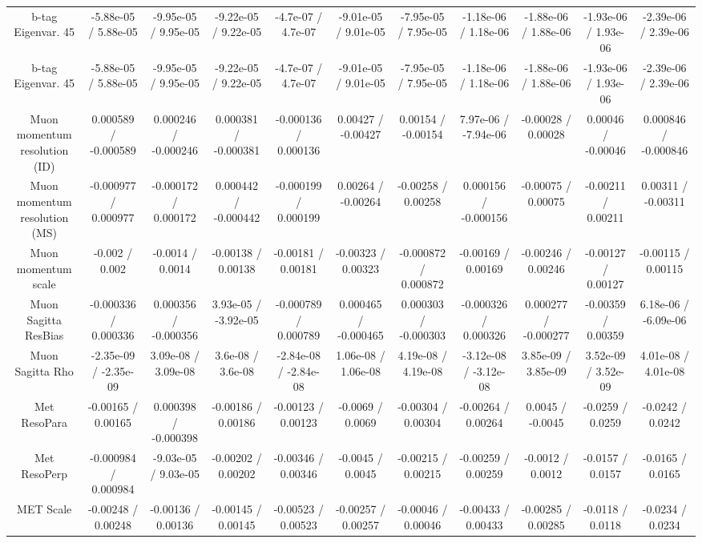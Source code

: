 \begin{table}[htbp]
\begin{center}
\begin{tabular}{|c|c|c|c|c|c|c|c|c|c|c|}
  b-tag Eigenvar. 45 & -5.88e-05 / 5.88e-05 & -9.95e-05 / 9.95e-05 & -9.22e-05 / 9.22e-05 & -4.7e-07 / 4.7e-07 & -9.01e-05 / 9.01e-05 & -7.95e-05 / 7.95e-05 & -1.18e-06 / 1.18e-06 & -1.88e-06 / 1.88e-06 & -1.93e-06 / 1.93e-06 & -2.39e-06 / 2.39e-06 \\ 
  b-tag Eigenvar. 45 & -5.88e-05 / 5.88e-05 & -9.95e-05 / 9.95e-05 & -9.22e-05 / 9.22e-05 & -4.7e-07 / 4.7e-07 & -9.01e-05 / 9.01e-05 & -7.95e-05 / 7.95e-05 & -1.18e-06 / 1.18e-06 & -1.88e-06 / 1.88e-06 & -1.93e-06 / 1.93e-06 & -2.39e-06 / 2.39e-06 \\ 
  Muon momentum resolution (ID) & 0.000589 / -0.000589 & 0.000246 / -0.000246 & 0.000381 / -0.000381 & -0.000136 / 0.000136 & 0.00427 / -0.00427 & 0.00154 / -0.00154 & 7.97e-06 / -7.94e-06 & -0.00028 / 0.00028 & 0.00046 / -0.00046 & 0.000846 / -0.000846 \\ 
  Muon momentum resolution (MS) & -0.000977 / 0.000977 & -0.000172 / 0.000172 & 0.000442 / -0.000442 & -0.000199 / 0.000199 & 0.00264 / -0.00264 & -0.00258 / 0.00258 & 0.000156 / -0.000156 & -0.00075 / 0.00075 & -0.00211 / 0.00211 & 0.00311 / -0.00311 \\ 
  Muon momentum scale & -0.002 / 0.002 & -0.0014 / 0.0014 & -0.00138 / 0.00138 & -0.00181 / 0.00181 & -0.00323 / 0.00323 & -0.000872 / 0.000872 & -0.00169 / 0.00169 & -0.00246 / 0.00246 & -0.00127 / 0.00127 & -0.00115 / 0.00115 \\ 
  Muon Sagitta ResBias & -0.000336 / 0.000336 & 0.000356 / -0.000356 & 3.93e-05 / -3.92e-05 & -0.000789 / 0.000789 & 0.000465 / -0.000465 & 0.000303 / -0.000303 & -0.000326 / 0.000326 & 0.000277 / -0.000277 & -0.00359 / 0.00359 & 6.18e-06 / -6.09e-06 \\ 
  Muon Sagitta Rho & -2.35e-09 / -2.35e-09 & 3.09e-08 / 3.09e-08 & 3.6e-08 / 3.6e-08 & -2.84e-08 / -2.84e-08 & 1.06e-08 / 1.06e-08 & 4.19e-08 / 4.19e-08 & -3.12e-08 / -3.12e-08 & 3.85e-09 / 3.85e-09 & 3.52e-09 / 3.52e-09 & 4.01e-08 / 4.01e-08 \\ 
  Met ResoPara & -0.00165 / 0.00165 & 0.000398 / -0.000398 & -0.00186 / 0.00186 & -0.00123 / 0.00123 & -0.0069 / 0.0069 & -0.00304 / 0.00304 & -0.00264 / 0.00264 & 0.0045 / -0.0045 & -0.0259 / 0.0259 & -0.0242 / 0.0242 \\ 
  Met ResoPerp & -0.000984 / 0.000984 & -9.03e-05 / 9.03e-05 & -0.00202 / 0.00202 & -0.00346 / 0.00346 & -0.0045 / 0.0045 & -0.00215 / 0.00215 & -0.00259 / 0.00259 & -0.0012 / 0.0012 & -0.0157 / 0.0157 & -0.0165 / 0.0165 \\ 
  MET Scale & -0.00248 / 0.00248 & -0.00136 / 0.00136 & -0.00145 / 0.00145 & -0.00523 / 0.00523 & -0.00257 / 0.00257 & -0.00046 / 0.00046 & -0.00433 / 0.00433 & -0.00285 / 0.00285 & -0.0118 / 0.0118 & -0.0234 / 0.0234 \\ 

\end{tabular}
\end{center}
\end{table}
